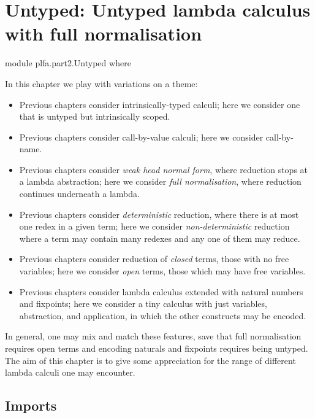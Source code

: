 \hypertarget{Untyped}{%
\chapter{Untyped: Untyped lambda calculus with full
normalisation}\label{Untyped}}

\begin{fence}
\begin{code}
module plfa.part2.Untyped where
\end{code}
\end{fence}

In this chapter we play with variations on a theme:

\begin{itemize}
\item
  Previous chapters consider intrinsically-typed calculi; here we
  consider one that is untyped but intrinsically scoped.
\item
  Previous chapters consider call-by-value calculi; here we consider
  call-by-name.
\item
  Previous chapters consider \emph{weak head normal form}, where
  reduction stops at a lambda abstraction; here we consider \emph{full
  normalisation}, where reduction continues underneath a lambda.
\item
  Previous chapters consider \emph{deterministic} reduction, where there
  is at most one redex in a given term; here we consider
  \emph{non-deterministic} reduction where a term may contain many
  redexes and any one of them may reduce.
\item
  Previous chapters consider reduction of \emph{closed} terms, those
  with no free variables; here we consider \emph{open} terms, those
  which may have free variables.
\item
  Previous chapters consider lambda calculus extended with natural
  numbers and fixpoints; here we consider a tiny calculus with just
  variables, abstraction, and application, in which the other constructs
  may be encoded.
\end{itemize}

In general, one may mix and match these features, save that full
normalisation requires open terms and encoding naturals and fixpoints
requires being untyped. The aim of this chapter is to give some
appreciation for the range of different lambda calculi one may
encounter.

\hypertarget{imports}{%
\section{Imports}\label{imports}}

